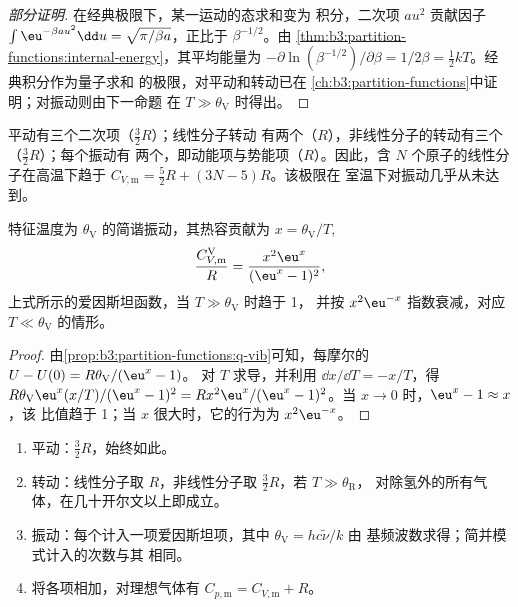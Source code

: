 \begin{proof}[部分证明]
在经典极限下，某一运动的态求和变为
积分，二次项 $a u^2$ 贡献因子 $\int\eu^{-\beta au^2}\dd u =
\sqrt{\pi/\beta a}$，正比于 $\beta^{-1/2}$。由
\cref{thm:b3:partition-functions:internal-energy}，其平均能量为
$-\partial\ln(\beta^{-1/2})/\partial\beta = 1/2\beta = \frac12kT$。经典积分作为量子求和
的极限，对平动和转动已在
\cref{ch:b3:partition-functions}中证明；对振动则由下一命题
在 $T \gg \theta_{\mathrm V}$ 时得出。
\end{proof}

平动有三个二次项（$\frac32R$）；线性分子转动
有两个（$R$），非线性分子的转动有三个（$\frac32R$）；每个振动有
两个，即动能项与势能项（$R$）。因此，含 $N$ 个原子的线性分子在高温下趋于
$C_{V,\mathrm m} = \frac52R + (3N - 5)R$。该极限在
室温下对振动几乎从未达到。

\begin{proposition}[振动热容]\label{prop:b3:statistical-thermo-applied:cv-vib}
特征温度为 $\theta_{\mathrm V}$ 的简谐振动，其热容贡献为
$x = \theta_{\mathrm V}/T$,
\[
  \frac{C_{V,\mathrm m}^{\mathrm V}}{R} = \frac{x^2\eu^x}{(\eu^x - 1)^2},
\]
上式所示的爱因斯坦函数，当 $T \gg \theta_{\mathrm V}$ 时趋于 1，
并按 $x^2\eu^{-x}$ 指数衰减，对应 $T \ll \theta_{\mathrm V}$ 的情形。
\end{proposition}

\begin{proof}
由\cref{prop:b3:partition-functions:q-vib}可知，每摩尔的 $U - U(0) = R\theta_{\mathrm V}/(\eu^x - 1)$。
对 $T$ 求导，并利用 $\dd x/\dd T = -x/T$，得
$R\theta_{\mathrm V}\eu^x(x/T)/(\eu^x - 1)^2 = Rx^2\eu^x/(\eu^x - 1)^2$。当 $x \to 0$ 时，$\eu^x - 1 \approx x$，该
比值趋于 1；当 $x$ 很大时，它的行为为 $x^2\eu^{-x}$。
\end{proof}

\begin{method}[由简正模式求气体的热容]\label{met:b3:statistical-thermo-applied:cv}
\begin{enumerate}
  \item 平动：$\frac32R$，始终如此。
  \item 转动：线性分子取 $R$，非线性分子取 $\frac32R$，若 $T \gg \theta_{\mathrm R}$，
        对除氢外的所有气体，在几十开尔文以上即成立。
  \item 振动：每个计入一项爱因斯坦项，其中 $\theta_{\mathrm V} = hc\tilde\nu/k$ 由
        基频波数求得；简并模式计入的次数与其
        相同。
  \item 将各项相加，对理想气体有 $C_{p,\mathrm m} = C_{V,\mathrm m} + R$。
\end{enumerate}
\end{method}

